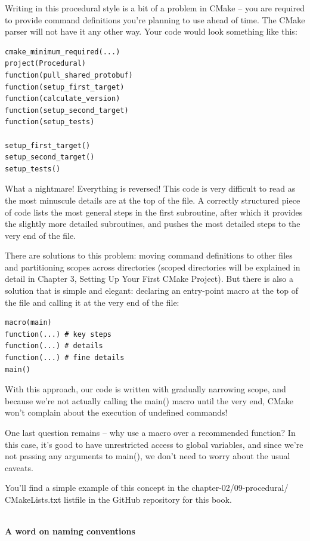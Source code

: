 Writing in this procedural style is a bit of a problem in CMake – you are required to provide command definitions you're planning to use ahead of time. The CMake parser will not have it any other way. Your code would look something like this:

\begin{lstlisting}[style=styleCMake]
cmake_minimum_required(...)
project(Procedural)
function(pull_shared_protobuf)
function(setup_first_target)
function(calculate_version)
function(setup_second_target)
function(setup_tests)

setup_first_target()
setup_second_target()
setup_tests()
\end{lstlisting}

What a nightmare! Everything is reversed! This code is very difficult to read as the most minuscule details are at the top of the file. A correctly structured piece of code lists the most general steps in the first subroutine, after which it provides the slightly more detailed subroutines, and pushes the most detailed steps to the very end of the file.

There are solutions to this problem: moving command definitions to other files and partitioning scopes across directories (scoped directories will be explained in detail in Chapter 3, Setting Up Your First CMake Project). But there is also a solution that is simple and elegant: declaring an entry-point macro at the top of the file and calling it at the very end of the file:

\begin{lstlisting}[style=styleCMake]
macro(main)
function(...) # key steps
function(...) # details
function(...) # fine details
main()
\end{lstlisting}

With this approach, our code is written with gradually narrowing scope, and because we're not actually calling the main() macro until the very end, CMake won't complain about the execution of undefined commands!

One last question remains – why use a macro over a recommended function? In this case, it's good to have unrestricted access to global variables, and since we're not passing any arguments to main(), we don't need to worry about the usual caveats.

You'll find a simple example of this concept in the chapter-02/09-procedural/ CMakeLists.txt listfile in the GitHub repository for this book.

\hspace*{\fill} \\ %
\noindent
\textbf{A word on naming conventions}

